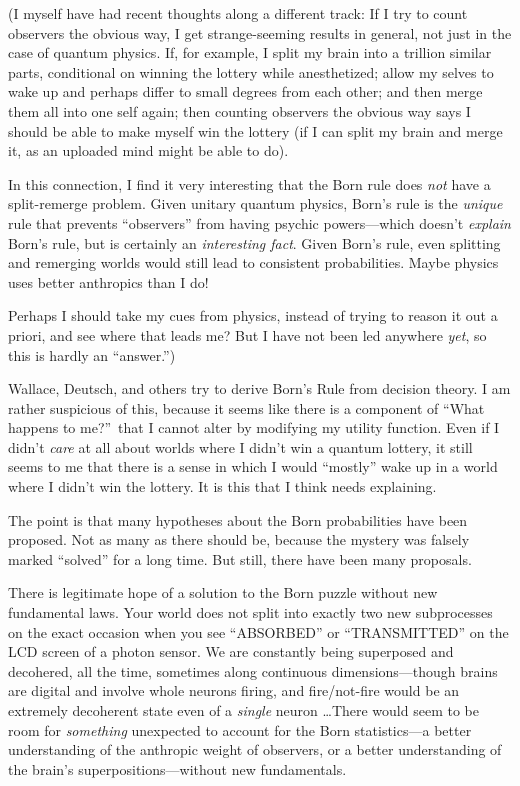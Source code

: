 {
 (I myself have had recent thoughts along a different track: If I
try to count observers the obvious way, I get strange-seeming results
in general, not just in the case of quantum physics. If, for example, I
split my brain into a trillion similar parts, conditional on winning
the lottery while anesthetized; allow my selves to wake up and perhaps
differ to small degrees from each other; and then merge them all into
one self again; then counting observers the obvious way says I should
be able to make myself win the lottery (if I can split my brain and
merge it, as an uploaded mind might be able to do).}

{
 In this connection, I find it very interesting that the Born rule
does \textit{not} have a split-remerge problem. Given unitary quantum
physics, Born's rule is the \textit{unique} rule that
prevents ``observers'' from having
psychic powers---which doesn't \textit{explain}
Born's rule, but is certainly an \textit{interesting
fact}. Given Born's rule, even splitting and remerging
worlds would still lead to consistent probabilities. Maybe physics uses
better anthropics than I do!}

{
 Perhaps I should take my cues from physics, instead of trying to
reason it out a priori, and see where that leads me? But I have not
been led anywhere \textit{yet}, so this is hardly an
``answer.'')}

{
 Wallace, Deutsch, and others try to derive Born's
Rule from decision theory. I am rather suspicious of this, because it
seems like there is a component of ``What happens to
me?''~that I cannot alter by modifying my utility
function. Even if I didn't \textit{care} at all about
worlds where I didn't win a quantum lottery, it still
seems to me that there is a sense in which I would
``mostly'' wake up in a world where
I didn't win the lottery. It is this that I think needs
explaining.}

{
 The point is that many hypotheses about the Born probabilities
have been proposed. Not as many as there should be, because the mystery
was falsely marked ``solved'' for a
long time. But still, there have been many proposals.}

{
 There is legitimate hope of a solution to the Born puzzle without
new fundamental laws. Your world does not split into exactly two new
subprocesses on the exact occasion when you see
``ABSORBED'' or
``TRANSMITTED'' on the LCD screen of
a photon sensor. We are constantly being superposed and decohered, all
the time, sometimes along continuous dimensions---though brains are
digital and involve whole neurons firing, and fire/not-fire would be an
extremely decoherent state even of a \textit{single} neuron \ldots There
would seem to be room for \textit{something} unexpected to account for
the Born statistics---a better understanding of the anthropic weight of
observers, or a better understanding of the brain's
superpositions---without new fundamentals.}

